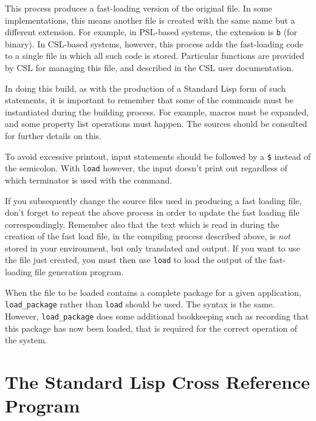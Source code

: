 This process produces a fast-loading version of the original file.  In some
implementations, this means another file is created with the same name but
a different extension. For example, in PSL-based systems, the extension is
\texttt{b} (for binary). In CSL-based systems, however, this process adds the
fast-loading code to a single file in which all such code is stored. 
Particular functions are provided by CSL for managing this file, and 
described in the CSL user documentation.

In doing this build, as with the production of a Standard Lisp form of
such statements, it is important to remember that some of the commands
must be instantiated during the building process.  For example, macros
must be expanded, and some property list operations must happen.
The {\REDUCE} sources should be consulted for further details on this.

To avoid excessive printout, input statements should be followed by a \texttt{\$}
instead of the semicolon.  With \texttt{load} however, the input doesn't
print out regardless of which terminator is used with the command.

If you subsequently change the source files used in producing a fast
loading file, don't forget to repeat the above process in order to update
the fast loading file correspondingly.  Remember also that the text which
is read in during the creation of the fast load file, in the compiling
process described above, is \emph{not} stored in your {\REDUCE}
environment, but only translated and output.  If you want to use the file
just created, you must then use \texttt{load} to load the output of the
fast-loading file generation program.

When the file to be loaded contains a complete package for a given
application, \texttt{load\_package} rather than
\texttt{load} should be used.  The syntax is the same.  However,
\texttt{load\_package} does some additional bookkeeping such as recording that
this package has now been loaded, that is required for the correct
operation of the system.

\section{The Standard Lisp Cross Reference Program}
\hypertarget{switch:CREF}{}

